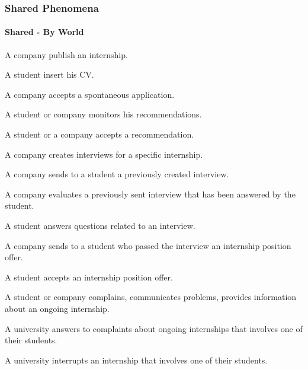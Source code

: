 \subsubsection{Shared Phenomena}
\paragraph{Shared - By World}
\begin{enumerate}[label={\color{titleColor}[SPW\arabic*]}]
\item A company publish an internship.
\item A student insert his CV.
\item A company accepts a spontaneous application.
\item A student or company monitors his recommendations.
\item A student or a company accepts a recommendation.
\item A company creates interviews for a specific internship.
\item A company sends to a student a previously created interview.
\item A company evaluates a previously sent interview that has been answered by the student.
\item A student answers questions related to an interview.
\item A company sends to a student who passed the interview an internship position offer.
\item A student accepts an internship position offer.
\item A student or company complains, communicates problems, provides information about an ongoing internship.
\item A university answers to complaints about ongoing internships that involves one of their students.
\item A university interrupts an internship that involves one of their students.
\end{enumerate}
